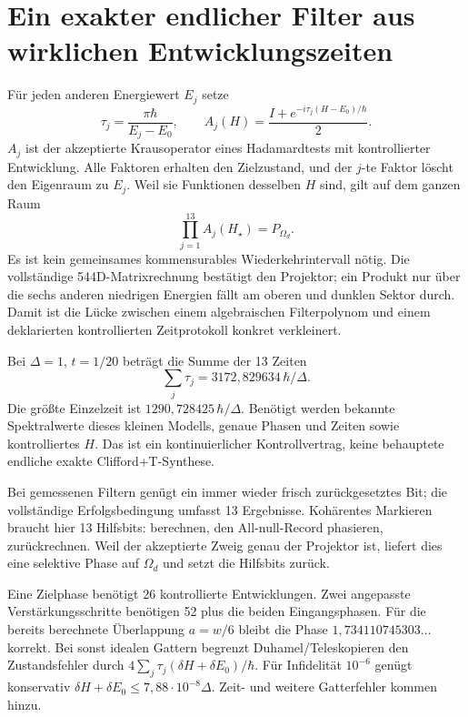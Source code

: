 \section{Ein exakter endlicher Filter aus wirklichen Entwicklungszeiten}
Für jeden anderen Energiewert $E_j$ setze
\begin{equation}
\tau_j=\frac{\pi\hbar}{E_j-E_0},\qquad
A_j(H)=\frac{I+e^{-i\tau_j(H-E_0)/\hbar}}2.
\end{equation}
$A_j$ ist der akzeptierte Krausoperator eines Hadamardtests mit kontrollierter Entwicklung. Alle Faktoren erhalten den Zielzustand, und der $j$-te Faktor löscht den Eigenraum zu $E_j$. Weil sie Funktionen desselben $H$ sind, gilt auf dem ganzen Raum
\begin{equation}\boxed{\prod_{j=1}^{13}A_j(H_\star)=P_{\Omega_d}.}
\end{equation}
Es ist kein gemeinsames kommensurables Wiederkehrintervall nötig. Die vollständige 544D-Matrixrechnung bestätigt den Projektor; ein Produkt nur über die sechs anderen niedrigen Energien fällt am oberen und dunklen Sektor durch. Damit ist die Lücke zwischen einem algebraischen Filterpolynom und einem deklarierten kontrollierten Zeitprotokoll konkret verkleinert.

Bei $\Delta=1$, $t=1/20$ beträgt die Summe der 13 Zeiten
\begin{equation}
\sum_j\tau_j=3172{,}829634\,\hbar/\Delta.
\end{equation}
Die größte Einzelzeit ist $1290{,}728425\,\hbar/\Delta$. Benötigt werden bekannte Spektralwerte dieses kleinen Modells, genaue Phasen und Zeiten sowie kontrolliertes $H$. Das ist ein kontinuierlicher Kontrollvertrag, keine behauptete endliche exakte Clifford+T-Synthese.

Bei gemessenen Filtern genügt ein immer wieder frisch zurückgesetztes Bit; die vollständige Erfolgsbedingung umfasst 13 Ergebnisse. Kohärentes Markieren braucht hier 13 Hilfsbits: berechnen, den All-null-Record phasieren, zurückrechnen. Weil der akzeptierte Zweig genau der Projektor ist, liefert dies eine selektive Phase auf $\Omega_d$ und setzt die Hilfsbits zurück.

Eine Zielphase benötigt 26 kontrollierte Entwicklungen. Zwei angepasste Verstärkungsschritte benötigen 52 plus die beiden Eingangsphasen. Für die bereits berechnete Überlappung $a=w/6$ bleibt die Phase $1{,}734110745303\ldots$ korrekt. Bei sonst idealen Gattern begrenzt Duhamel/Teleskopieren den Zustandsfehler durch $4\sum_j\tau_j(\delta H+\delta E_0)/\hbar$. Für Infidelität $10^{-6}$ genügt konservativ $\delta H+\delta E_0\le7{,}88\cdot10^{-8}\Delta$. Zeit- und weitere Gatterfehler kommen hinzu.

